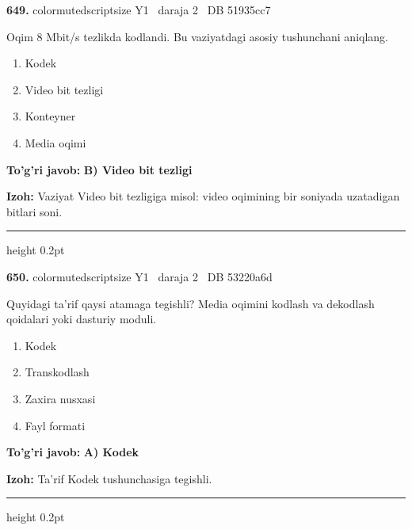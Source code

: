 \documentclass[10pt,a4paper,oneside]{article}
\begin{document}
\noindent\textbf{\color{ink}649.}  {color{muted}scriptsize Y1 \textbullet\ daraja 2 \textbullet\ DB 51935cc7}
\par
Oqim 8 Mbit/s tezlikda kodlandi. Bu vaziyatdagi asosiy tushunchani aniqlang.
\begin{enumerate}[label=\Alph*),leftmargin=9mm]
\item Kodek
\item Video bit tezligi
\item Konteyner
\item Media oqimi
\end{enumerate}
\begin{tcolorbox}[enhanced,breakable,colback=teal!4,colframe=teal!50!black,boxrule=0.5pt,arc=1.1mm,left=3mm,right=3mm,top=1.7mm,bottom=1.7mm,before skip=2mm,after skip=2mm]
\textbf{\color{teal}To'g'ri javob:} \textbf{B) Video bit tezligi}
\par\smallskip
\textbf{Izoh:} Vaziyat Video bit tezligiga misol: video oqimining bir soniyada uzatadigan bitlari soni.
\end{tcolorbox}
\vspace{2mm}\hrule height 0.2pt \vspace{3mm}

\noindent\textbf{\color{ink}650.}  {color{muted}scriptsize Y1 \textbullet\ daraja 2 \textbullet\ DB 53220a6d}
\par
Quyidagi ta'rif qaysi atamaga tegishli? Media oqimini kodlash va dekodlash qoidalari yoki dasturiy moduli.
\begin{enumerate}[label=\Alph*),leftmargin=9mm]
\item Kodek
\item Transkodlash
\item Zaxira nusxasi
\item Fayl formati
\end{enumerate}
\begin{tcolorbox}[enhanced,breakable,colback=teal!4,colframe=teal!50!black,boxrule=0.5pt,arc=1.1mm,left=3mm,right=3mm,top=1.7mm,bottom=1.7mm,before skip=2mm,after skip=2mm]
\textbf{\color{teal}To'g'ri javob:} \textbf{A) Kodek}
\par\smallskip
\textbf{Izoh:} Ta'rif Kodek tushunchasiga tegishli.
\end{tcolorbox}
\vspace{2mm}\hrule height 0.2pt \vspace{3mm}
\end{document}

